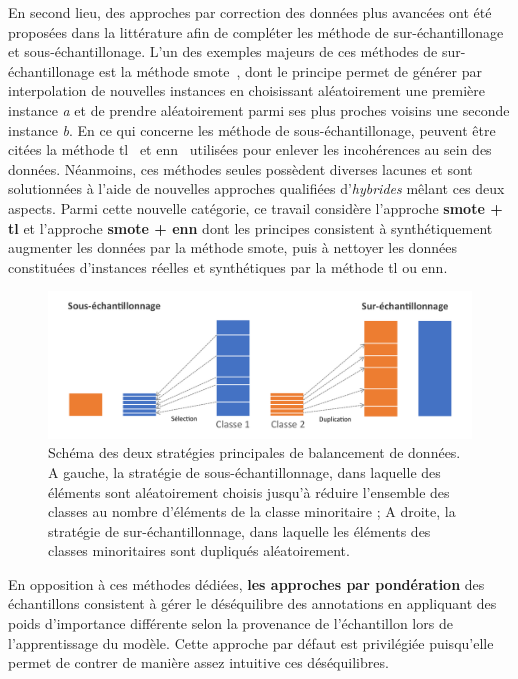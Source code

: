 En second lieu, des approches par correction des données plus avancées ont été proposées dans la littérature afin de compléter les méthode de sur-échantillonage et sous-échantillonage. L'un des exemples majeurs de ces méthodes de sur-échantillonage est la méthode \gls{smote}~\cite{Chawla2002}, dont le principe permet de générer par interpolation de nouvelles instances en choisissant aléatoirement une première instance \textit{a} et de prendre aléatoirement parmi ses plus proches voisins une seconde instance \textit{b}. En ce qui concerne les méthode de sous-échantillonage, peuvent être citées la méthode \gls{tl}~\cite{Tomek1976} et \gls{enn}~\cite{Wilson1972} utilisées pour enlever les incohérences au sein des données. Néanmoins, ces méthodes seules possèdent diverses lacunes et sont solutionnées à l'aide de nouvelles approches qualifiées d'\textit{hybrides} mêlant ces deux aspects. Parmi cette nouvelle catégorie, ce travail considère l'approche \textbf{\gls{smote} + \gls{tl}} et l'approche \textbf{\gls{smote} + \gls{enn}} dont les principes consistent à synthétiquement augmenter les données par la méthode \gls{smote}, puis à nettoyer les données constituées d'instances réelles et synthétiques par la méthode \gls{tl} ou \gls{enn}.

\begin{figure}[H]
    \centering
    \includegraphics[width=\linewidth]{contents/chapter_4/resources/scheme_data_balancing.pdf}
    \caption{Schéma des deux stratégies principales de balancement de données. A gauche, la stratégie de sous-échantillonnage, dans laquelle des éléments sont aléatoirement choisis jusqu'à réduire l'ensemble des classes au nombre d'éléments de la classe minoritaire ; A droite, la stratégie de sur-échantillonnage, dans laquelle les éléments des classes minoritaires sont dupliqués aléatoirement. }
    \label{fig:scheme_data_balancing}
\end{figure}\par

En opposition à ces méthodes dédiées, \textbf{les approches par pondération} des échantillons consistent à gérer le déséquilibre des annotations en appliquant des poids d'importance différente selon la provenance de l'échantillon lors de l'apprentissage du modèle. Cette approche par défaut est privilégiée puisqu'elle permet de contrer de manière assez intuitive ces déséquilibres.\par

